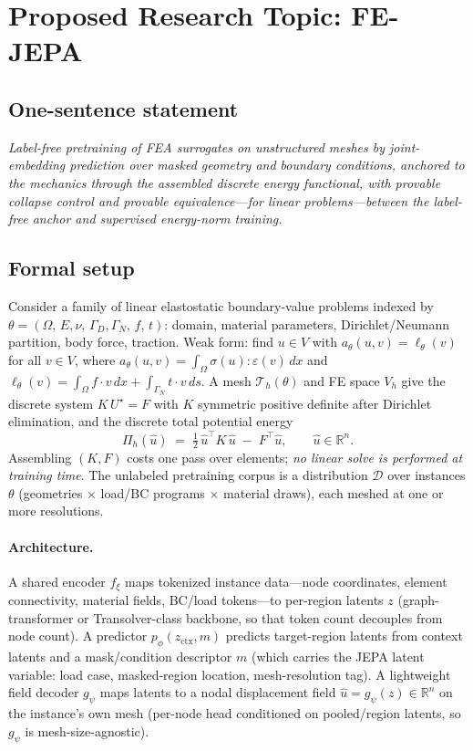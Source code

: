 \documentclass[11pt]{article}
\newcommand{\R}{\mathbb{R}}
\begin{document}
\section{Proposed Research Topic: FE-JEPA}
\label{sec:proposal}

\subsection{One-sentence statement}

\emph{Label-free pretraining of FEA surrogates on unstructured meshes by
joint-embedding prediction over masked geometry and boundary conditions,
anchored to the mechanics through the assembled discrete energy functional,
with provable collapse control and provable equivalence---for linear
problems---between the label-free anchor and supervised energy-norm
training.}

\subsection{Formal setup}
\label{sec:setup}

Consider a family of linear elastostatic boundary-value problems indexed by
$\theta=(\Omega,\,E,\nu,\,\Gamma_D,\Gamma_N,\,f,\,t)$: domain, material
parameters, Dirichlet/Neumann partition, body force, traction. Weak form:
find $u\in V$ with $a_\theta(u,v)=\ell_\theta(v)$ for all $v\in V$, where
$a_\theta(u,v)=\int_\Omega \sigma(u):\varepsilon(v)\,dx$ and
$\ell_\theta(v)=\int_\Omega f\cdot v\,dx+\int_{\Gamma_N} t\cdot v\,ds$.
A mesh $\mathcal{T}_h(\theta)$ and FE space $V_h$ give the discrete system
$K\,U^\star=F$ with $K$ symmetric positive definite after Dirichlet
elimination, and the discrete total potential energy
\begin{equation}
\Pi_h(\hat u)\;=\;\tfrac12\,\hat u^\top K\,\hat u\;-\;F^\top \hat u,
\qquad \hat u\in\R^{n}.
\label{eq:energy}
\end{equation}
Assembling $(K,F)$ costs one pass over elements; \emph{no linear solve is
performed at training time}. The unlabeled pretraining corpus is a
distribution $\mathcal{D}$ over instances $\theta$ (geometries $\times$
load/BC programs $\times$ material draws), each meshed at one or more
resolutions.

\paragraph{Architecture.}
A shared encoder $f_\xi$ maps tokenized instance data---node coordinates,
element connectivity, material fields, BC/load tokens---to per-region latents
$z$ (graph-transformer or Transolver-class backbone, so that token count
decouples from node count). A predictor $p_\phi(z_{\mathrm{ctx}},m)$ predicts
target-region latents from context latents and a mask/condition descriptor
$m$ (which carries the JEPA latent variable: load case, masked-region
location, mesh-resolution tag). A lightweight field decoder $g_\psi$ maps
latents to a nodal displacement field $\hat u=g_\psi(z)\in\R^{n}$ on the
instance's own mesh (per-node head conditioned on pooled/region latents, so
$g_\psi$ is mesh-size-agnostic).
\end{document}

